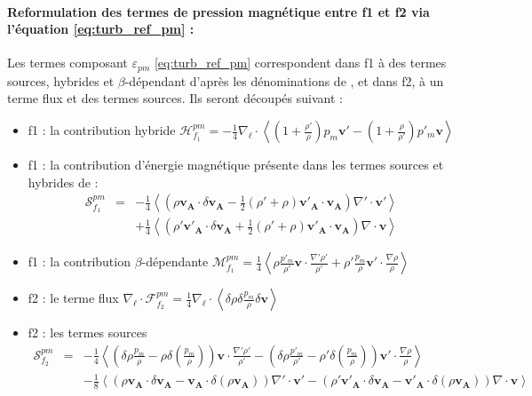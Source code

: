  \paragraph{Reformulation des termes de pression magnétique entre f1 et f2 via l'équation \eqref{eq:turb_ref_pm} : }
 Les termes composant $\varepsilon_{pm}$ \eqref{eq:turb_ref_pm} correspondent dans f1 à des termes sources, hybrides et $\beta$-dépendant d'après les dénominations de , et dans f2, à un terme flux et des termes sources. 
 Ils seront découpés suivant : 
 \begin{itemize}
     \item f1 : la contribution hybride $\mathcal{H}^{pm}_{f_1} = - \frac{1}{4} \nabla_{\boldsymbol{\ell}} \cdot \left<\left(1+\frac{\rho'}{\rho}\right) p_m \boldsymbol{v'} - \left(1+\frac{\rho}{\rho'}\right)p'_m\boldsymbol{v} \right>$
     \item f1 : la contribution d'énergie magnétique présente dans les termes sources et hybrides de  : 
     \begin{eqnarray*}
         \mathcal{S}^{pm}_{f_1} &=&  - \frac{1}{4} \left<\left(\rho \boldsymbol{v_A} \cdot \delta \boldsymbol{v_A} - \frac{1}{2}\left(\rho' + \rho\right) \boldsymbol{v'_A} \cdot \boldsymbol{v_A}\right)\nabla' \cdot \boldsymbol{v'} \right>\\
         &&+ \frac{1}{4} \left<\left(\rho' \boldsymbol{v'_A} \cdot \delta \boldsymbol{v_A} + \frac{1}{2}\left(\rho' + \rho\right) \boldsymbol{v'_A} \cdot \boldsymbol{v_A}\right)\nabla \cdot \boldsymbol{v}\right>
     \end{eqnarray*}
     \item f1 : la contribution $\beta$-dépendante $\mathcal{M}^{pm}_{f_1} =  \frac{1}{4} \left<\rho \frac{p'_m}{\rho'} \boldsymbol{v} \cdot \frac{\nabla'\rho'}{\rho'} + \rho' \frac{p_m}{\rho} \boldsymbol{v'} \cdot \frac{\nabla\rho}{\rho} \right> $
     \item f2 : le terme flux $\nabla_{\boldsymbol{\ell}} \cdot \mathcal{F}^{pm}_{f_2} = \frac{1}{4} \nabla_{\boldsymbol{\ell}} \cdot\left<\delta \rho  \delta \frac{p_m}{\rho} \delta \boldsymbol{v}\right> $ 
     \item f2 : les termes sources 
     \begin{eqnarray*}
         \mathcal{S}^{pm}_{f_2} &=&  - \frac{1}{4} \left<\left(\delta \rho \frac{p_m}{\rho} - \rho \delta \left(\frac{p_m}{\rho}\right)\right)\boldsymbol{v} \cdot \frac{\nabla' \rho'}{\rho'} - \left(\delta \rho \frac{p'_m}{\rho'} - \rho' \delta \left(\frac{p_m}{\rho}\right)\right)\boldsymbol{v'} \cdot \frac{\nabla \rho}{\rho} \right>\\
         &&-\frac{1}{8}\left<\left(\rho \boldsymbol{v_A} \cdot \delta \boldsymbol{v_A} - \boldsymbol{v_A} \cdot \delta \left(\rho \boldsymbol{v_A}\right)\right)\nabla' \cdot \boldsymbol{v'} - \left(\rho' \boldsymbol{v'_A} \cdot \delta \boldsymbol{v_A} - \boldsymbol{v'_A} \cdot \delta \left(\rho \boldsymbol{v_A}\right)\right)\nabla \cdot \boldsymbol{v}\right>
         \end{eqnarray*}
 \end{itemize}
